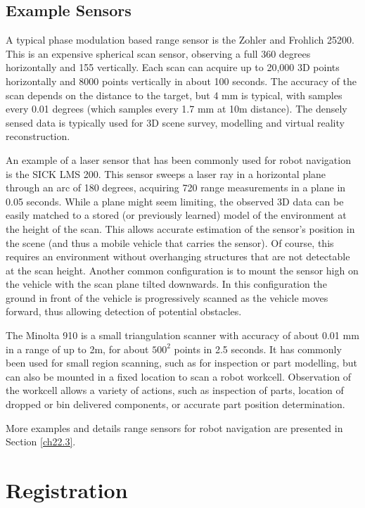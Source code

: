 \documentclass[twocolumn,oneside]{book}
\begin{document}
\subsection{Example Sensors}

A typical phase modulation based range sensor is the Zohler and Frohlich 25200.
This is an expensive spherical scan sensor, observing a full 360 degrees
horizontally and 155 vertically. Each scan can acquire up to 20,000 3D points
horizontally and 8000 points vertically in about 100 seconds.
The accuracy of the scan depends on the distance to the target, but
4 mm is typical, with samples every 0.01 degrees (which samples every
1.7 mm at 10m distance).
The densely sensed data is typically used for 3D scene survey, modelling and
virtual reality reconstruction.

An example of a laser sensor that has been commonly used for robot navigation
is the SICK LMS 200.
This sensor sweeps a laser ray in a horizontal plane through an arc of 180
degrees, acquiring 720 range measurements in a plane in 0.05 seconds.
While a plane might seem limiting, the observed 3D data can be easily matched
to a stored (or previously learned) model of the environment at the
height of the scan.
This allows accurate estimation of the sensor's position in the scene
(and thus a mobile vehicle that carries the sensor).
Of course, this requires an environment without overhanging structures
that are not detectable at the scan height.
Another common configuration is to mount the sensor high on the vehicle 
with the scan plane tilted downwards. In this configuration the ground
in front of the vehicle is progressively scanned as the vehicle moves forward,
thus allowing detection of potential obstacles.

The Minolta 910 is a small triangulation scanner with accuracy of about 0.01 mm
in a range of up to 2m, for about $500^2$ points in 2.5 seconds.
It has commonly been used for small region scanning, such as for inspection
or part modelling, but can also be mounted in a fixed location to scan
a robot workcell. 
Observation of the workcell allows a variety of actions, such as
inspection of parts, location of dropped or bin delivered components,
or accurate part position determination.

More examples and details range sensors for robot navigation are presented
in Section \ref{ch22.3}.

\section{Registration \label{ch22.2}}
\end{document}
